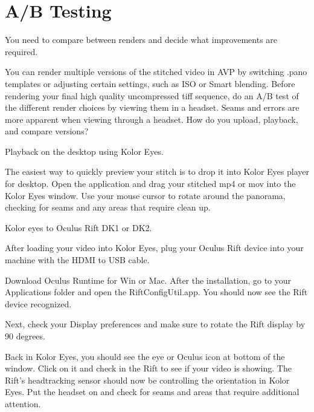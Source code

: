 \chapter{A/B Testing}
\pagecolor{white}
\label{chap:46}
\begin{fullwidth}

\problem

{\large You need to compare between renders and decide what improvements are required. \par}

You can render multiple versions of the stitched video in AVP by switching .pano templates or adjusting certain settings, such as ISO or Smart blending. Before rendering your final high quality uncompressed tiff sequence, do an A/B test of the different render choices by viewing them in a headset. Seams and errors are more apparent when viewing through a headset. How do you upload, playback, and compare versions?

\solutions

{\large Playback on the desktop using Kolor Eyes. \par}


The easiest way to quickly preview your stitch is to drop it into Kolor Eyes player for desktop. Open the application and drag your stitched mp4 or mov into the Kolor Eyes window. Use your mouse cursor to rotate around the panorama, checking for seams and any areas that require clean up.  

{\large Kolor eyes to Oculus Rift DK1 or DK2. \par}

After loading your video into Kolor Eyes, plug your Oculus Rift device into your machine with the HDMI to USB cable.

Download Oculus Runtime for Win or Mac. After the installation, go to your Applications folder and open the RiftConfigUtil.app. You should now see the Rift device recognized.


Next, check your Display preferences and make sure to rotate the Rift display by 90 degrees.


Back in Kolor Eyes, you should see the eye or Oculus icon at bottom of the window. Click on it and check in the Rift to see if your video is showing. The Rift’s headtracking sensor should now be controlling the orientation in Kolor Eyes. Put the headset on and check for seams and areas that require additional attention.


\end{fullwidth}
